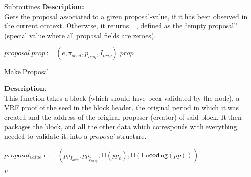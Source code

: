 \documentclass[10pt,a4paper]{article}
\begin{document}
\begin{section}{Subroutines}
\noindent \textbf{Description:}\\ Gets the proposal associated to a given proposal-value, 
if it has been observed in the current context.
Otherwise, it returns $\bot$, defined as the ``empty proposal'' (special value where all
proposal fields are zeroes).

\begin{algorithm}[H]
    \begin{algorithmic}[1]

        \State $proposal \ prop := (e, \pi_{seed}, p_{orig}, I_{orig})$
        \Return $prop$

    \EndFunction
    \end{algorithmic}
    \caption{\underline{Make Proposal}}
\end{algorithm}


\noindent \textbf{Description:}\\ This function takes a block (which should have been validated by the node),
a VRF proof of the seed in the block header, the original period in which it was created and the address of the
original proposer (creator) of said block. It then packages the block, and all the other data which corresponds
with everything needed to validate it, into a $proposal$ structure.

\begin{algorithm}[H]\label{proposal-value}
    \begin{algorithmic}[1]

    \State $proposal_{value} \ v := (pp_{I_{orig}}, pp_{p_{orig}}, \mathsf{H}(pp_e), \mathsf{H}(\mathsf{Encoding}(pp)))$

    \Return $v$


\end{algorithmic}
\end{algorithm}
\end{section}
\end{document}
